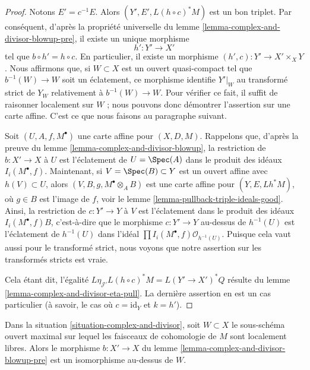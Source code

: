 \begin{proof}
Notons $E' = c^{-1}E$. Alors $(Y', E', L(h \circ c)^*M)$ est un bon
triplet. Par conséquent, d'après la propriété universelle du
lemme \ref{lemma-complex-and-divisor-blowup-pre},
il existe un unique morphisme
$$
h' : Y' \longrightarrow X'
$$
tel que $b \circ h' = h \circ c$. En particulier, il existe un morphisme
$(h', c) : Y' \to X' \times_X Y$. Nous affirmons que, si $W \subset X$ est un ouvert
quasi-compact tel que $b^{-1}(W) \to W$ soit un éclatement,
ce morphisme identifie $Y'|_W$ au transformé strict de $Y_W$
relativement à $b^{-1}(W) \to W$. Pour vérifier ce fait,
il suffit de raisonner localement sur $W$ ; nous pouvons donc démontrer
l'assertion sur une carte affine. C'est ce que nous faisons au paragraphe suivant.

\medskip\noindent
Soit $(U, A, f, M^\bullet)$ une carte affine pour $(X, D, M)$.
Rappelons que, d'après la preuve du lemme \ref{lemma-complex-and-divisor-blowup},
la restriction de $b : X' \to X$ à $U$ est l'éclatement
de $U = \Spec(A)$ dans le produit des idéaux $I_i(M^\bullet, f)$.
Maintenant, si $V = \Spec(B) \subset Y$ est un ouvert affine avec $h(V) \subset U$,
alors $(V, B, g, M^\bullet \otimes_A B)$ est une carte affine pour
$(Y, E, Lh^*M)$, où $g \in B$ est l'image de $f$, voir le
lemme \ref{lemma-pullback-triple-ideals-good}.
Ainsi, la restriction de $c : Y' \to Y$ à $V$
est l'éclatement dans le produit des idéaux
$I_i(M^\bullet, f)B$, c'est-à-dire que le morphisme $c : Y' \to Y$ au-dessus de
$h^{-1}(U)$ est l'éclatement de $h^{-1}(U)$ dans
l'idéal $\prod I_i(M^\bullet, f) \mathcal{O}_{h^{-1}(U)}$.
Puisque cela vaut aussi pour le transformé strict, nous voyons que
notre assertion sur les transformés stricts est vraie.

\medskip\noindent
Cela étant dit, l'égalité
$L\eta_{\mathcal{J}'}L(h \circ c)^*M = L(Y' \to X')^*Q$
résulte du
lemme \ref{lemma-complex-and-divisor-eta-pull}.
La dernière assertion en est un cas particulier
(à savoir, le cas où $c = \text{id}_Y$ et $k = h'$).
\end{proof}

\begin{lemma}
\label{lemma-complex-and-divisor-blowup-good}
Dans la situation \ref{situation-complex-and-divisor}, soit $W \subset X$
le sous-schéma ouvert maximal sur lequel les faisceaux de cohomologie
de $M$ sont localement libres. Alors le morphisme $b : X' \to X$
du lemme \ref{lemma-complex-and-divisor-blowup-pre} est un isomorphisme
au-dessus de $W$.
\end{lemma}

